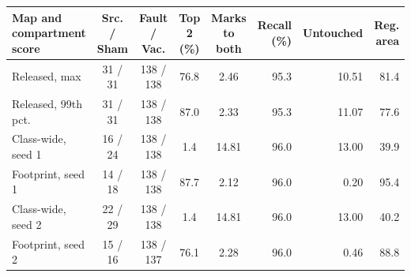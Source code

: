 \begin{tabular}{lccccrrr}
\toprule
Map and compartment score & Src. / Sham & Fault / Vac. & Top 2 (\%) & Marks to both & Recall (\%) & Untouched & Reg. area \\
\midrule
Released, max & 31 / 31 & 138 / 138 & 76.8 & 2.46 & 95.3 & 10.51 & 81.4 \\
Released, 99th pct. & 31 / 31 & 138 / 138 & 87.0 & 2.33 & 95.3 & 11.07 & 77.6 \\
\midrule
Class-wide, seed 1 & 16 / 24 & 138 / 138 & 1.4 & 14.81 & 96.0 & 13.00 & 39.9 \\
Footprint, seed 1 & 14 / 18 & 138 / 138 & 87.7 & 2.12 & 96.0 & 0.20 & 95.4 \\
\midrule
Class-wide, seed 2 & 22 / 29 & 138 / 138 & 1.4 & 14.81 & 96.0 & 13.00 & 40.2 \\
Footprint, seed 2 & 15 / 16 & 138 / 137 & 76.1 & 2.28 & 96.0 & 0.46 & 88.8 \\
\bottomrule
\end{tabular}
